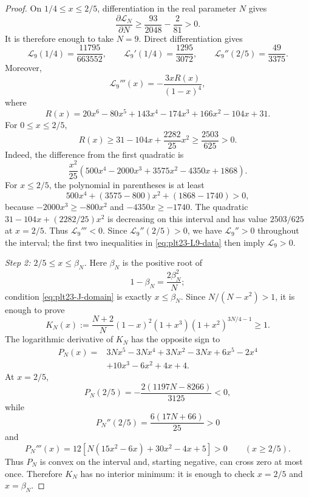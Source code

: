 \documentclass[11pt]{article}
\numberwithin{equation}{section}
\begin{document}
\begin{proof}
  On $1/4\le x\le2/5$, differentiation in the real parameter $N$ gives
  \[
    \frac{\partial\mathcal L_N}{\partial N}
    \ge\frac{93}{2048}-\frac{2}{81}>0.
  \]
  It is therefore enough to take $N=9$.  Direct differentiation gives
  \begin{equation}\label{eq:plt23-L9-data}
    \mathcal L_9(1/4)=\frac{11795}{663552},
    \qquad
    \mathcal L_9'(1/4)=\frac{1295}{3072},
    \qquad
    \mathcal L_9''(2/5)=\frac{49}{3375}.
  \end{equation}
  Moreover,
  \[
    \mathcal L_9'''(x)=-\frac{3xR(x)}{(1-x)^4},
  \]
  where
  \[
    R(x)=20x^6-80x^5+143x^4-174x^3+166x^2-104x+31.
  \]
  For $0\le x\le2/5$,
  \[
    R(x)\ge31-104x+\frac{2282}{25}x^2
    \ge\frac{2503}{625}>0.
  \]
  Indeed, the difference from the first quadratic is
  \[
    \frac{x^2}{25}
    (500x^4-2000x^3+3575x^2-4350x+1868).
  \]
  For $x\le2/5$, the polynomial in parentheses is at least
  \[
    500x^4+(3575-800)x^2+(1868-1740)>0,
  \]
  because $-2000x^3\ge-800x^2$ and $-4350x\ge-1740$.
  The quadratic $31-104x+(2282/25)x^2$ is decreasing on this interval and
  has value $2503/625$ at $x=2/5$.  Thus
  $\mathcal L_9'''<0$.  Since $\mathcal L_9''(2/5)>0$, we have
  $\mathcal L_9''>0$ throughout the interval; the first two inequalities in
  \eqref{eq:plt23-L9-data} then imply $\mathcal L_9>0$.

  \smallskip
  \noindent\emph{Step 2: $2/5\le x\le\beta_N$.}
  Here $\beta_N$ is the positive root of
  \[
    1-\beta_N=\frac{2\beta_N^2}{N};
  \]
  condition \eqref{eq:plt23-J-domain} is exactly $x\le\beta_N$.  Since
  $N/(N-x^2)>1$, it is enough to prove
  \begin{equation}\label{eq:plt23-K-N-def}
    K_N(x):=
    \frac{N+2}{N}(1-x)^2(1+x^3)(1+x^2)^{3N/4-1}\ge1.
  \end{equation}
  The logarithmic derivative of $K_N$ has the opposite sign to
  \begin{align}
    P_N(x)={}&3Nx^5-3Nx^4+3Nx^2-3Nx
    +6x^5-2x^4\\
    &+10x^3-6x^2+4x+4.
    \label{eq:plt23-P-N}
  \end{align}
  At $x=2/5$,
  \[
    P_N(2/5)=-\frac{2(1197N-8266)}{3125}<0,
  \]
  while
  \[
    P_N''(2/5)=\frac{6(17N+66)}{25}>0
  \]
  and
  \[
    P_N'''(x)=12\left[N(15x^2-6x)+30x^2-4x+5\right]>0
    \qquad(x\ge2/5).
  \]
  Thus $P_N$ is convex on the interval and, starting negative, can cross
  zero at most once.  Therefore $K_N$ has no interior minimum: it is enough
  to check $x=2/5$ and $x=\beta_N$.


\end{proof}
\end{document}
